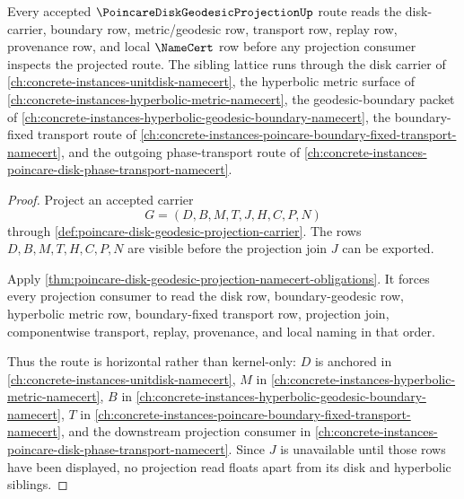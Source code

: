 \begin{theorem}
\label{thm:poincare-disk-geodesic-projection-sibling-lattice}
Every accepted $\PoincareDiskGeodesicProjectionUp$ route reads the disk-carrier, boundary row, metric/geodesic row, transport row, replay row, provenance row, and local $\NameCert$ row before any projection consumer inspects the projected route. The sibling lattice runs through the disk carrier of \autoref{ch:concrete-instances-unitdisk-namecert}, the hyperbolic metric surface of \autoref{ch:concrete-instances-hyperbolic-metric-namecert}, the geodesic-boundary packet of \autoref{ch:concrete-instances-hyperbolic-geodesic-boundary-namecert}, the boundary-fixed transport route of \autoref{ch:concrete-instances-poincare-boundary-fixed-transport-namecert}, and the outgoing phase-transport route of \autoref{ch:concrete-instances-poincare-disk-phase-transport-namecert}.
\end{theorem}
\begin{proof}
Project an accepted carrier
$$
G=(D,B,M,T,J,H,C,P,N)
$$
through \autoref{def:poincare-disk-geodesic-projection-carrier}. The rows $D,B,M,T,H,C,P,N$ are visible before the projection join $J$ can be exported.

Apply \autoref{thm:poincare-disk-geodesic-projection-namecert-obligations}. It forces every projection consumer to read the disk row, boundary-geodesic row, hyperbolic metric row, boundary-fixed transport row, projection join, componentwise transport, replay, provenance, and local naming in that order.

Thus the route is horizontal rather than kernel-only: $D$ is anchored in \autoref{ch:concrete-instances-unitdisk-namecert}, $M$ in \autoref{ch:concrete-instances-hyperbolic-metric-namecert}, $B$ in \autoref{ch:concrete-instances-hyperbolic-geodesic-boundary-namecert}, $T$ in \autoref{ch:concrete-instances-poincare-boundary-fixed-transport-namecert}, and the downstream projection consumer in \autoref{ch:concrete-instances-poincare-disk-phase-transport-namecert}. Since $J$ is unavailable until those rows have been displayed, no projection read floats apart from its disk and hyperbolic siblings.
\end{proof}

